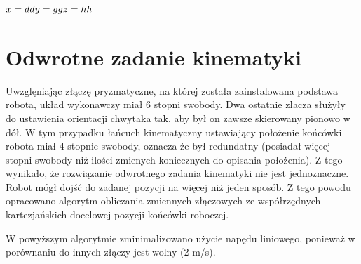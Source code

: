 \noindent
$x = dd \\
y = gg \\
z = hh \\$

\newpage
\section{Odwrotne zadanie kinematyki}
\label{sec:odwrotneZadanieKinematyki}

Uwzglęniając złączę pryzmatyczne, na której została zainstalowana podstawa robota, układ wykonawczy miał 6 stopni swobody. Dwa ostatnie złacza służyły do ustawienia orientacji chwytaka tak, aby był on zawsze skierowany pionowo w dół. W tym przypadku łańcuch kinematyczny ustawiający położenie końcówki robota miał 4 stopnie swobody, oznacza że był redundatny (posiadał więcej stopni swobody niż ilości zmienych koniecznych do opisania położenia). Z tego wynikało, że rozwiązanie odwrotnego zadania kinematyki nie jest jednoznaczne. Robot mógł dojść do zadanej pozycji na więcej niż jeden sposób. Z tego powodu opracowano algorytm obliczania zmiennych złączowych ze współrzędnych kartezjańskich docelowej pozycji końcówki roboczej.

W powyższym algorytmie zminimalizowano użycie napędu liniowego, ponieważ w porównaniu do innych złączy jest wolny (2 m/s).
